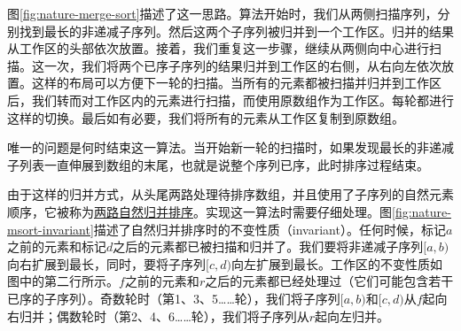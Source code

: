 \documentclass{ctexart}
\begin{document}
图\ref{fig:nature-merge-sort}描述了这一思路。算法开始时，我们从两侧扫描序列，分别找到最长的非递减子序列。然后这两个子序列被归并到一个工作区。归并的结果从工作区的头部依次放置。接着，我们重复这一步骤，继续从两侧向中心进行扫描。这一次，我们将两个已序子序列的结果归并到工作区的右侧，从右向左依次放置。这样的布局可以方便下一轮的扫描。当所有的元素都被扫描并归并到工作区后，我们转而对工作区内的元素进行扫描，而使用原数组作为工作区。每轮都进行这样的切换。最后如有必要，我们将所有的元素从工作区复制到原数组。

唯一的问题是何时结束这一算法。当开始新一轮的扫描时，如果发现最长的非递减子列表一直伸展到数组的末尾，也就是说整个序列已序，此时排序过程结束。

由于这样的归并方式，从头尾两路处理待排序数组，并且使用了子序列的自然元素顺序，它被称为\underline{两路自然归并排序}。实现这一算法时需要仔细处理。图\ref{fig:nature-msort-invariant}描述了自然归并排序时的不变性质（invariant）。任何时候，标记$a$之前的元素和标记$d$之后的元素都已被扫描和归并了。我们要将非递减子序列$[a, b)$向右扩展到最长，同时，要将子序列$[c, d)$向左扩展到最长。工作区的不变性质如图中的第二行所示。$f$之前的元素和$r$之后的元素都已经处理过（它们可能包含若干已序的子序列）。奇数轮时（第1、3、5……轮），我们将子序列$[a, b)$和$[c, d)$从$f$起向右归并；偶数轮时（第2、4、6……轮），我们将子序列从$r$起向左归并。
\end{document}
